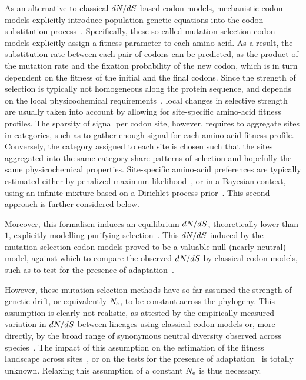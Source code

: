 As an alternative to classical $dN/dS$-based \gls{codon} models, mechanistic \gls{codon} models explicitly introduce population genetic equations into the \gls{codon} \gls{substitution} process~\citep{Halpern1998}.
Specifically, these so-called mutation-selection \gls{codon} models explicitly assign a fitness parameter to each amino acid.
As a result, the \gls{substitution} rate between each pair of \glspl{codon} can be predicted, as the product of the mutation rate and the fixation probability of the new \gls{codon}, which is in turn dependent on the fitness of the initial and the final \glspl{codon}.
Since the strength of selection is typically not homogeneous along the protein sequence, and depends on the local physicochemical requirements~\citep{Echave2016, Goldstein2016,Goldstein2017}, local changes in selective strength are usually taken into account by allowing for site-specific amino-acid fitness profiles.
The sparsity of signal per \gls{codon} site, however, requires to aggregate sites in categories, such as to gather enough signal for each amino-acid fitness profile.
Conversely, the category assigned to each site is chosen such that the sites aggregated into the same category share patterns of selection and hopefully the same physicochemical properties.
Site-specific amino-acid preferences are typically estimated either by penalized maximum likelihood~\citep{Tamuri2012,Tamuri2014}, or in a Bayesian context, using an infinite mixture based on a \gls{Dirichlet process} prior~\citep{Rodrigue2010,Rodrigue2014}.
This second approach is further considered below.

Moreover, this formalism induces an equilibrium $dN/dS$, theoretically lower than $1$, explicitly modelling purifying selection~\citep{Spielman2015, DosReis2015}.
This $dN/dS$ induced by the mutation-selection \gls{codon} models proved to be a valuable null (\gls{nearly-neutral}) model, against which to compare the observed $dN/dS$ by classical \gls{codon} models, such as to test for the presence of adaptation~\citep{Rodrigue2016}.

However, these mutation-selection methods have so far assumed the strength of \gls{genetic drift}, or equivalently $N_{\text{e}}$, to be constant across the phylogeny.
This assumption is clearly not realistic, as attested by the empirically measured variation in $dN/dS$ between lineages using classical \gls{codon} models or, more directly, by the broad range of \gls{synonymous} \gls{neutral} diversity observed across species~\citep{Galtier2016}.
The impact of this assumption on the estimation of the fitness landscape across sites~\citep{Tamuri2014, Rodrigue2014}, or on the tests for the presence of adaptation~\citep{Rodrigue2016} is totally unknown.
Relaxing this assumption of a constant $N_{\text{e}}$ is thus necessary.

